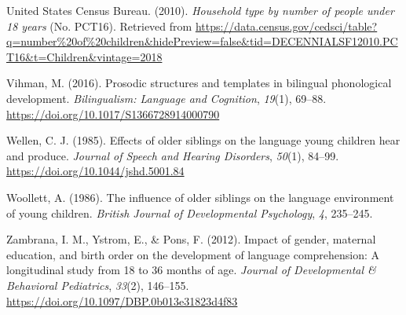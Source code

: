 \documentclass[
  english,
  man,floatsintext]{apa6}
\newlength{\cslhangindent}
\newlength{\cslentryspacingunit} %
\newenvironment{CSLReferences}[2] %
 {%
  \setlength{\parindent}{0pt}
  \ifodd #1
  \let\oldpar\par
  \def\par{\hangindent=\cslhangindent\oldpar}
  \fi
  \setlength{\parskip}{#2\cslentryspacingunit}
 }%
 {}
\begin{document}
\begin{CSLReferences}{1}{0}
\leavevmode{}%
United States Census Bureau. (2010). \emph{Household type by number of people under 18 years} (No. {PCT}16). Retrieved from \url{https://data.census.gov/cedsci/table?q=number\%20of\%20children\&hidePreview=false\&tid=DECENNIALSF12010.PCT16\&t=Children\&vintage=2018}

\leavevmode{}%
Vihman, M. (2016). Prosodic structures and templates in bilingual phonological development. \emph{Bilingualism: Language and Cognition}, \emph{19}(1), 69--88. \url{https://doi.org/10.1017/S1366728914000790}

\leavevmode{}%
Wellen, C. J. (1985). Effects of older siblings on the language young children hear and produce. \emph{Journal of Speech and Hearing Disorders}, \emph{50}(1), 84--99. \url{https://doi.org/10.1044/jshd.5001.84}

\leavevmode{}%
Woollett, A. (1986). The influence of older siblings on the language environment of young children. \emph{British Journal of Developmental Psychology}, \emph{4}, 235--245.

\leavevmode{}%
Zambrana, I. M., Ystrom, E., \& Pons, F. (2012). Impact of gender, maternal education, and birth order on the development of language comprehension: A longitudinal study from 18 to 36 months of age. \emph{Journal of Developmental \& Behavioral Pediatrics}, \emph{33}(2), 146--155. \url{https://doi.org/10.1097/DBP.0b013e31823d4f83}

\end{CSLReferences}

\endgroup
\end{document}
